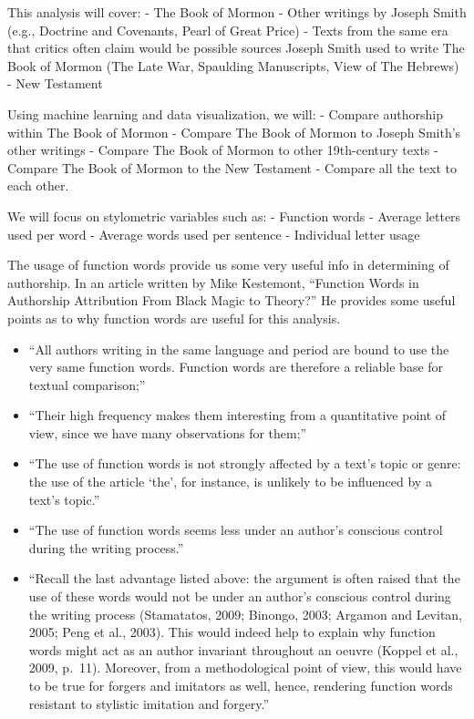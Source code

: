 \documentclass[
  letterpaper,
  DIV=11,
  numbers=noendperiod]{scrartcl}
\begin{document}
This analysis will cover: - The Book of Mormon - Other writings by
Joseph Smith (e.g., Doctrine and Covenants, Pearl of Great Price) -
Texts from the same era that critics often claim would be possible
sources Joseph Smith used to write The Book of Mormon (The Late War,
Spaulding Manuscripts, View of The Hebrews) - New Testament

Using machine learning and data visualization, we will: - Compare
authorship within The Book of Mormon - Compare The Book of Mormon to
Joseph Smith's other writings - Compare The Book of Mormon to other
19th-century texts - Compare The Book of Mormon to the New Testament -
Compare all the text to each other.

We will focus on stylometric variables such as: - Function words -
Average letters used per word - Average words used per sentence -
Individual letter usage

The usage of function words provide us some very useful info in
determining of authorship. In an article written by Mike Kestemont,
``Function Words in Authorship Attribution From Black Magic to Theory?''
He provides some useful points as to why function words are useful for
this analysis.

\begin{itemize}
\item
  ``All authors writing in the same language and period are bound to use
  the very same function words. Function words are therefore a reliable
  base for textual comparison;''
\item
  ``Their high frequency makes them interesting from a quantitative
  point of view, since we have many observations for them;''
\item
  ``The use of function words is not strongly affected by a text's topic
  or genre: the use of the article `the', for instance, is unlikely to
  be influenced by a text's topic.''
\item
  ``The use of function words seems less under an author's conscious
  control during the writing process.''
\item
  ``Recall the last advantage listed above: the argument is often raised
  that the use of these words would not be under an author's conscious
  control during the writing process (Stamatatos, 2009; Binongo, 2003;
  Argamon and Levitan, 2005; Peng et al., 2003). This would indeed help
  to explain why function words might act as an author invariant
  throughout an oeuvre (Koppel et al., 2009, p.~11). Moreover, from a
  methodological point of view, this would have to be true for forgers
  and imitators as well, hence, rendering function words resistant to
  stylistic imitation and forgery.''
\end{itemize}
\end{document}
